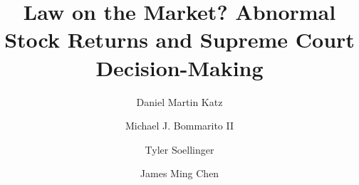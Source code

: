 \documentclass[preprint,12pt]{elsarticle}
\begin{document}
\begin{frontmatter}


\title{Law on the Market? Abnormal Stock Returns and Supreme Court Decision-Making}




\author[1,2]{Daniel Martin Katz}
\author[1,2]{Michael J. Bommarito II}
\author[3]{Tyler Soellinger}
\author[3]{James Ming Chen}

\address[1]{Illinois Institute of Technology - Chicago Kent College of Law}
\address[2]{CodeX - The Stanford Center for Legal Informatics}
\address[3]{Michigan State University College of Law}


\end{frontmatter}
\end{document}
